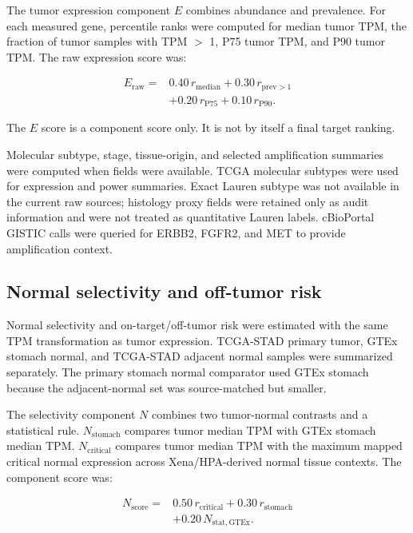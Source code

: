 \documentclass[review,12pt,authoryear]{elsarticle}
\begin{document}
The tumor expression component $E$ combines abundance and prevalence. For each measured gene, percentile ranks were computed for median tumor TPM, the fraction of tumor samples with TPM \ensuremath{>} 1, P75 tumor TPM, and P90 tumor TPM. The raw expression score was:

\begin{equation}
\begin{split}
E_{\mathrm{raw}} ={}& 0.40\,r_{\mathrm{median}}
 + 0.30\,r_{\mathrm{prev>1}} \\
& + 0.20\,r_{\mathrm{P75}}
 + 0.10\,r_{\mathrm{P90}}.
\end{split}
\end{equation}

The $E$ score is a component score only. It is not by itself a final target ranking.

Molecular subtype, stage, tissue-origin, and selected amplification summaries were computed when fields were available. TCGA molecular subtypes were used for expression and power summaries. Exact Lauren subtype was not available in the current raw sources;\allowbreak{} histology proxy fields were retained only as audit information and were not treated as quantitative Lauren labels. cBioPortal GISTIC calls were queried for ERBB2, FGFR2, and MET to provide amplification context.

\subsection{Normal selectivity and off-tumor risk}

Normal selectivity and on-target/\allowbreak{}off-tumor risk were estimated with the same TPM transformation as tumor expression. TCGA-STAD primary tumor, GTEx stomach normal, and TCGA-STAD adjacent normal samples were summarized separately. The primary stomach normal comparator used GTEx stomach because the adjacent-normal set was source-matched but smaller.

The selectivity component $N$ combines two tumor-normal contrasts and a statistical rule. $N_{\mathrm{stomach}}$ compares tumor median TPM with GTEx stomach median TPM. $N_{\mathrm{critical}}$ compares tumor median TPM with the maximum mapped critical normal expression across Xena/\allowbreak{}HPA-derived normal tissue contexts. The component score was:

\begin{equation}
\begin{split}
N_{\mathrm{score}} ={}& 0.50\,r_{\mathrm{critical}}
 + 0.30\,r_{\mathrm{stomach}} \\
& + 0.20\,N_{\mathrm{stat,GTEx}}.
\end{split}
\end{equation}
\end{document}
